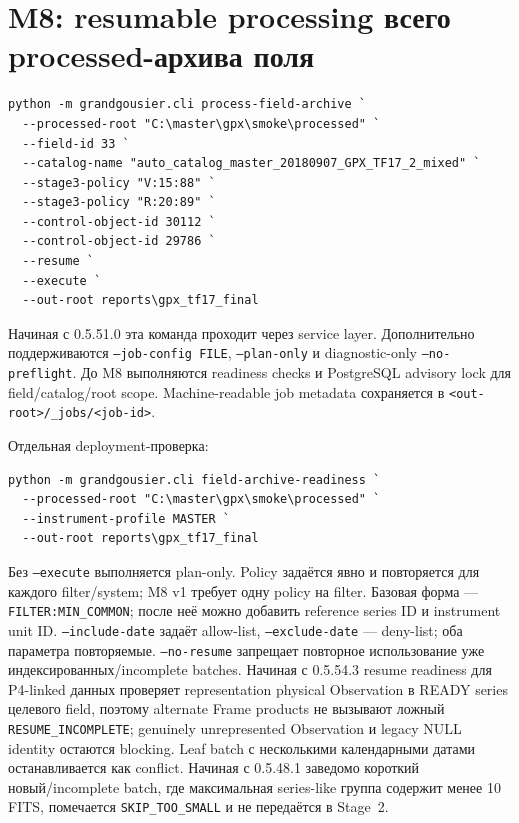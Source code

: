 \section{M8: resumable processing всего processed-архива поля}

\begin{lstlisting}
python -m grandgousier.cli process-field-archive `
  --processed-root "C:\master\gpx\smoke\processed" `
  --field-id 33 `
  --catalog-name "auto_catalog_master_20180907_GPX_TF17_2_mixed" `
  --stage3-policy "V:15:88" `
  --stage3-policy "R:20:89" `
  --control-object-id 30112 `
  --control-object-id 29786 `
  --resume `
  --execute `
  --out-root reports\gpx_tf17_final
\end{lstlisting}

Начиная с 0.5.51.0 эта команда проходит через service layer. Дополнительно поддерживаются \texttt{--job-config FILE}, \texttt{--plan-only} и diagnostic-only \texttt{--no-preflight}. До M8 выполняются readiness checks и PostgreSQL advisory lock для field/catalog/root scope. Machine-readable job metadata сохраняется в \texttt{<out-root>/\_jobs/<job-id>}.

Отдельная deployment-проверка:

\begin{lstlisting}
python -m grandgousier.cli field-archive-readiness `
  --processed-root "C:\master\gpx\smoke\processed" `
  --instrument-profile MASTER `
  --out-root reports\gpx_tf17_final
\end{lstlisting}

Без \texttt{--execute} выполняется plan-only. Policy задаётся явно и повторяется для каждого filter/system; M8 v1 требует одну policy на filter. Базовая форма --- \texttt{FILTER:MIN\_COMMON}; после неё можно добавить reference series ID и instrument unit ID. \texttt{--include-date} задаёт allow-list, \texttt{--exclude-date} --- deny-list; оба параметра повторяемые. \texttt{--no-resume} запрещает повторное использование уже индексированных/incomplete batches. Начиная с 0.5.54.3 resume readiness для P4-linked данных проверяет representation physical Observation в READY series целевого field, поэтому alternate Frame products не вызывают ложный \texttt{RESUME\_INCOMPLETE}; genuinely unrepresented Observation и legacy NULL identity остаются blocking. Leaf batch с несколькими календарными датами останавливается как conflict. Начиная с 0.5.48.1 заведомо короткий новый/incomplete batch, где максимальная series-like группа содержит менее 10 FITS, помечается \texttt{SKIP\_TOO\_SMALL} и не передаётся в Stage~2.

